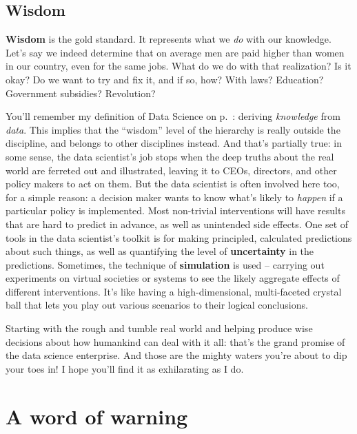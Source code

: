 \subsection{Wisdom}

\textbf{Wisdom} is the gold standard. It represents what we \textit{do} with
our knowledge. Let's say we indeed determine that on average men are paid
higher than women in our country, even for the same jobs. What do we do with
that realization? Is it okay? Do we want to try and fix it, and if so, how?
With laws? Education? Government subsidies? Revolution?


You'll remember my definition of Data Science on p.~\pageref{dsDefinition}:
deriving \textit{knowledge} from \textit{data}. This implies that the
``wisdom'' level of the hierarchy is really outside the discipline, and belongs
to other disciplines instead. And that's partially true: in some sense, the
data scientist's job stops when the deep truths about the real world are
ferreted out and illustrated, leaving it to CEOs, directors, and other policy
makers to act on them. But the data scientist is often involved here too, for a
simple reason: a decision maker wants to know what's likely to \textit{happen}
if a particular policy is implemented. Most non-trivial interventions will have
results that are hard to predict in advance, as well as unintended side
effects. One set of tools in the data scientist's toolkit is for making
principled, calculated predictions about such things, as well as quantifying
the level of \textbf{uncertainty} in the predictions. Sometimes, the technique
of \textbf{simulation} is used -- carrying out experiments on virtual societies
or systems to see the likely aggregate effects of different interventions. It's
like having a high-dimensional, multi-faceted crystal ball that lets you play
out various scenarios to their logical conclusions.

\bigskip

Starting with the rough and tumble real world and helping produce wise
decisions about how humankind can deal with it all: that's the grand promise of
the data science enterprise. And those are the mighty waters you're about to
dip your toes in! I hope you'll find it as exhilarating as I do.



\section{A word of warning}

